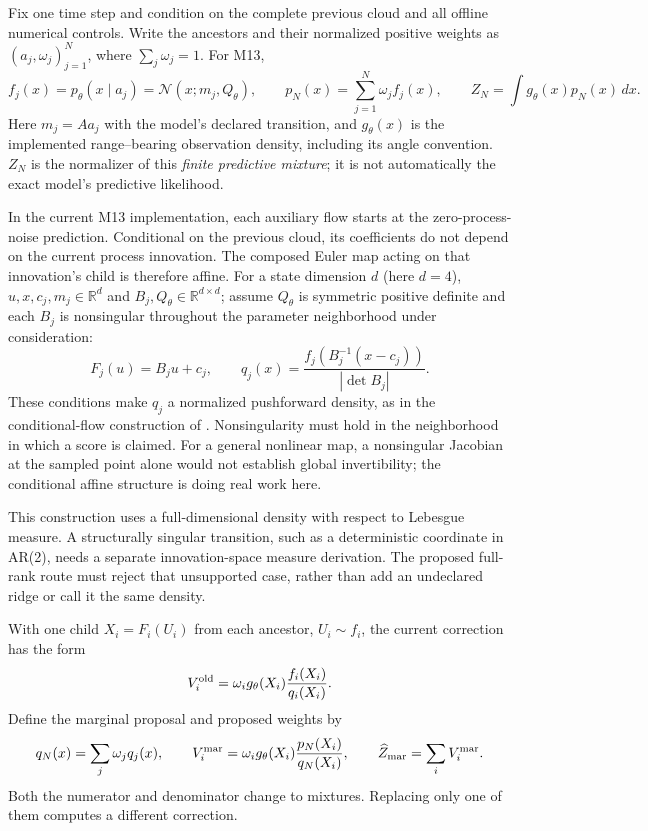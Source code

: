 \documentclass[11pt]{article}
\newcommand{\N}{\mathcal N}
\begin{document}
Fix one time step and condition on the complete previous cloud and all
offline numerical controls. Write the ancestors and their normalized
positive weights as $(a_j,\omega_j)_{j=1}^N$, where
$\sum_j\omega_j=1$. For M13,
\begin{equation}
 f_j(x)=p_\theta(x\mid a_j)=\N(x;m_j,Q_\theta),\qquad
 p_N(x)=\sum_{j=1}^N\omega_j f_j(x),\qquad
 Z_N=\int g_\theta(x)p_N(x)\,dx .
 \label{eq:predictive-mixture}
\end{equation}
Here $m_j=Aa_j$ with the model's declared transition, and $g_\theta(x)$ is
the implemented range--bearing observation density, including its angle
convention. $Z_N$ is the normalizer of this \emph{finite predictive
mixture}; it is not automatically the exact model's predictive likelihood.

In the current M13 implementation, each auxiliary flow starts at the
zero-process-noise prediction. Conditional on the previous cloud, its
coefficients do not depend on the current process innovation. The composed
Euler map acting on that innovation's child is therefore affine. For a
state dimension $d$ (here $d=4$), $u,x,c_j,m_j\in\mathbb R^d$ and
$B_j,Q_\theta\in\mathbb R^{d\times d}$; assume $Q_\theta$ is symmetric
positive definite and each $B_j$ is nonsingular throughout the
parameter neighborhood under consideration:
\begin{equation}
 F_j(u)=B_j u+c_j,\qquad
 q_j(x)=\frac{f_j\!\left(B_j^{-1}(x-c_j)\right)}
                   {|\det B_j|}.
 \label{eq:affine-density}
\end{equation}
These conditions make $q_j$ a normalized pushforward density, as in the
conditional-flow construction of \cite[Algorithm~1 and Eqs.~(19)--(20)]{li}.
Nonsingularity must hold in the neighborhood in which a score is claimed.
For a general nonlinear map, a nonsingular Jacobian at the sampled point
alone would not establish global invertibility; the conditional affine
structure is doing real work here.

This construction uses a full-dimensional density with respect to Lebesgue
measure. A structurally singular transition, such as a deterministic
coordinate in AR(2), needs a separate innovation-space measure derivation.
The proposed full-rank route must reject that unsupported case, rather
than add an undeclared ridge or call it the same density.

With one child $X_i=F_i(U_i)$ from each ancestor, $U_i\sim f_i$, the current
correction has the form
\begin{equation}
 V_i^{\rm old}=\omega_i g_\theta(X_i)
                         \frac{f_i(X_i)}{q_i(X_i)} .
 \label{eq:old-weight}
\end{equation}
Define the marginal proposal and proposed weights by
\begin{equation}
 q_N(x)=\sum_j\omega_j q_j(x),\qquad
 V_i^{\rm mar}=\omega_i g_\theta(X_i)
                       \frac{p_N(X_i)}{q_N(X_i)},\qquad
 \widehat Z_{\rm mar}=\sum_i V_i^{\rm mar}.
 \label{eq:marginal-weight}
\end{equation}
Both the numerator and denominator change to mixtures. Replacing only one
of them computes a different correction.
\end{document}

